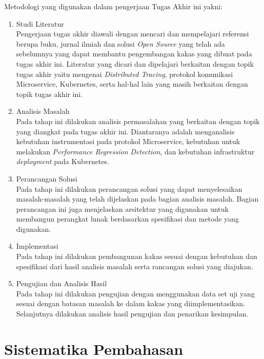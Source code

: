 Metodologi yang digunakan dalam pengerjaan Tugas Akhir ini yakni:
\begin{enumerate}
    \item Studi Literatur \\
          Pengerjaan tugas akhir diawali dengan mencari dan mempelajari referensi berupa buku, jurnal ilmiah dan solusi \textit{Open Source}  yang telah ada sebelumnya yang dapat membantu pengembangan kakas yang dibuat pada tugas akhir ini. Literatur yang dicari dan dipelajari berkaitan dengan topik tugas akhir yaitu mengenai \textit{Distributed Tracing},  protokol komunikasi Microservice, Kubernetes, serta hal-hal lain yang masih berkaitan dengan topik tugas akhir ini.

    \item Analisis Masalah \\
          Pada tahap ini dilakukan analisis permasalahan yang berkaitan dengan topik yang diangkat pada tugas akhir ini. Diantaranya adalah menganalisis kebutuhan instrumentasi pada protokol Microservice, kebutuhan untuk melakukan \textit{Performance Regression Detection}, dan kebutuhan infrastruktur \textit{deployment} pada Kubernetes.

    \item Perancangan Solusi \\
          Pada tahap ini dilakukan perancangan solusi yang dapat menyelesaikan masalah-masalah yang telah dijelaskan pada bagian analisis masalah. Bagian perancangan ini juga menjelaskan arsitektur yang digunakan untuk membangun perangkat lunak berdasarkan spesifikasi dan metode yang digunakan.

    \item Implementasi \\
          Pada tahap ini dilakukan pembangunan kakas sesuai dengan kebutuhan dan spesifikasi dari hasil analisis masalah serta rancangan solusi yang diajukan.

    \item Pengujian dan Analisis Hasil \\
          Pada tahap ini dilakukan pengujian dengan menggunakan data set uji yang sesuai dengan batasan masalah ke dalam kakas yang diimplementasikan. Selanjutnya dilakukan analisis hasil pengujian dan penarikan kesimpulan.

\end{enumerate}

\section{Sistematika Pembahasan}

